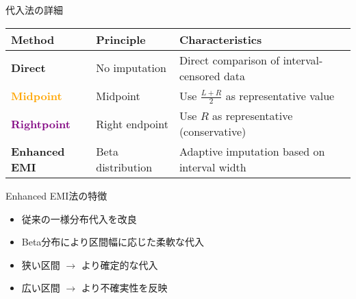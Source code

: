 \documentclass[11pt,aspectratio=169]{beamer}
\begin{document}
\begin{frame}{代入法の詳細}
\begin{table}[h]
\centering
\begin{tabular}{|l|l|p{5.5cm}|}
\hline
\textbf{Method} & \textbf{Principle} & \textbf{Characteristics} \\
\hline
\textcolor{primary}{\textbf{Direct}} & No imputation & Direct comparison of interval-censored data \\
\hline
\textcolor{orange}{\textbf{Midpoint}} & Midpoint & Use $\frac{L + R}{2}$ as representative value \\
\hline
\textcolor{purple}{\textbf{Rightpoint}} & Right endpoint & Use $R$ as representative (conservative) \\
\hline
\textcolor{accent}{\textbf{Enhanced EMI}} & Beta distribution & Adaptive imputation based on interval width \\
\hline
\end{tabular}
\end{table}

\vspace{1em}

\begin{block}{Enhanced EMI法の特徴}
\begin{itemize}
\item 従来の一様分布代入を改良
\item Beta分布により区間幅に応じた柔軟な代入
\item 狭い区間 $\rightarrow$ より確定的な代入
\item 広い区間 $\rightarrow$ より不確実性を反映
\end{itemize}
\end{block}
\end{frame}
\end{document}

